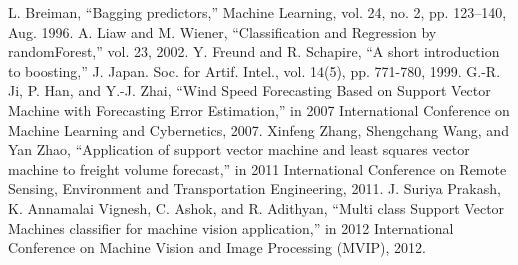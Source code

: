 \documentclass[conference]{IEEEtran}
\begin{document}
\begin{thebibliography}{00}
		 L. Breiman, ``Bagging predictors,'' Machine Learning, vol. 24, no. 2, pp. 123–140, Aug. 1996.
		 A. Liaw and M. Wiener, ``Classification and Regression by randomForest,'' vol. 23, 2002.
		 Y. Freund and R. Schapire, ``A short introduction to boosting,'' J. Japan. Soc. for Artif. Intel., vol. 14(5), pp. 771-780, 1999.
		 G.-R. Ji, P. Han, and Y.-J. Zhai, ``Wind Speed Forecasting Based on Support Vector Machine with Forecasting Error Estimation,'' in 2007 International Conference on Machine Learning and Cybernetics, 2007.
		 Xinfeng Zhang, Shengchang Wang, and Yan Zhao, ``Application of support vector machine and least squares vector machine to freight volume forecast,'' in 2011 International Conference on Remote Sensing, Environment and Transportation Engineering, 2011.
		 J. Suriya Prakash, K. Annamalai Vignesh, C. Ashok, and R. Adithyan, ``Multi class Support Vector Machines classifier for machine vision application,'' in 2012 International Conference on Machine Vision and Image Processing (MVIP), 2012.
	\end{thebibliography}
\end{document}
